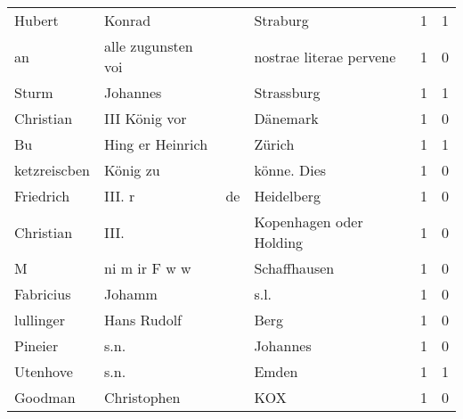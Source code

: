 \begin{center}
\begin{tiny}
\begin{longtabu}{llllrr}
                   Hubert &                             Konrad &             &                                    Straburg &          1 &         1 \\
                       an &                 alle zugunsten voi &             &                     nostrae literae pervene &          1 &         0 \\
                    Sturm &                           Johannes &             &                                  Strassburg &          1 &         1 \\
                Christian &                      III König vor &             &                                    Dänemark &          1 &         0 \\
                       Bu &                   Hing er Heinrich &             &                                      Zürich &          1 &         1 \\
             ketzreiscben &                           König zu &             &                                 könne. Dies &          1 &         0 \\
                Friedrich &                             III. r &          de &                                  Heidelberg &          1 &         0 \\
                Christian &                               III. &             &                     Kopenhagen oder Holding &          1 &         0 \\
                        M &                      ni m ir F w w &             &                                Schaffhausen &          1 &         0 \\
                Fabricius &                             Johamm &             &                                        s.l. &          1 &         0 \\
                lullinger &                        Hans Rudolf &             &                                        Berg &          1 &         0 \\
                  Pineier &                               s.n. &             &                                    Johannes &          1 &         0 \\
                 Utenhove &                               s.n. &             &                                       Emden &          1 &         1 \\
                  Goodman &                        Christophen &             &                                         KOX &          1 &         0 \\

\end{longtabu}
\end{tiny}
\end{center}
